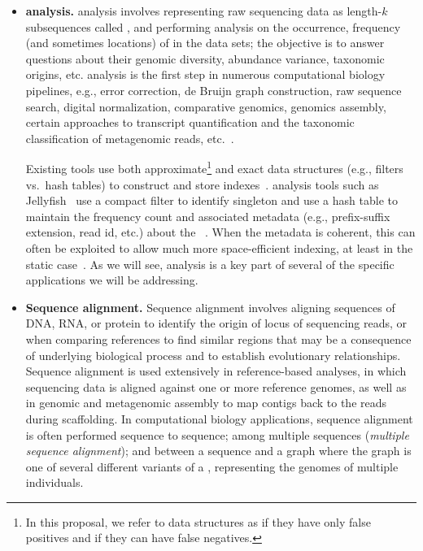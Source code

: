 \begin{itemize}%
\item \textbf{\Kmer analysis.}
\Kmer analysis involves representing raw sequencing data as length-$k$ subsequences called , and performing analysis on the occurrence, frequency (and sometimes locations) of \kmers in the data sets; the objective is to answer questions about their genomic diversity, abundance variance, taxonomic origins, etc. \Kmer analysis is the first step in numerous computational biology pipelines, e.g., error correction, de Bruijn graph construction, raw sequence search, digital normalization, comparative genomics, genomics assembly, certain approaches to transcript quantification and the taxonomic classification of metagenomic reads, etc.~\cite{wood2014kraken,GeorganasEHG18,hofmeyr2020terabase,solomon2016fast,PatroSailfish:2014,PandeyAlBe18,PandeyBJP17,PandeyBeJo17b}.

Existing tools use both  approximate\footnote{In this proposal, we refer to data structures as  if they  have only false positives and  if they can have false negatives.} and exact data structures (e.g., filters vs.\ hash tables) to construct and store \kmer indexes~\cite{MarccaisKi11,PandeyBJP17}.  \Kmer analysis tools such as  Jellyfish~\cite{MarccaisKi11} use a compact filter to identify singleton \kmers and use a hash table to maintain the frequency count and associated metadata (e.g., prefix-suffix extension, read id, etc.) about the \kmers~\cite{hofmeyr2020terabase}. When the metadata is coherent, this can often be exploited to allow much more space-efficient indexing, at least in the static case~\cite{pibiri2022sparse,pibiri2023weighted,fan2023spt,fan2023fulgor}.
As we will see, \kmer analysis is a key part of several of the specific applications we will be addressing. 

\item \textbf{Sequence alignment.} Sequence alignment involves aligning sequences of DNA, RNA, or protein to identify the origin of locus of sequencing reads, or when comparing references to find similar regions that may be a consequence of underlying biological process and to establish evolutionary relationships.
Sequence alignment is used extensively in reference-based analyses, in which sequencing data is aligned against one or more reference genomes, as well as in genomic and metagenomic assembly to map contigs back to the reads during scaffolding. In computational biology applications, sequence alignment is often performed sequence to sequence; among multiple sequences (\emph{multiple sequence alignment}); and between a sequence and a graph where the graph is one of several different variants of a , representing the genomes of multiple individuals.


\end{itemize}
